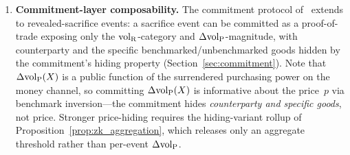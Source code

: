 \begin{theorem}
\begin{enumerate}
\item[\textbf{(P4)}] \textbf{Commitment-layer composability.}
  The commitment protocol
  of~\citep[Definition~6]{lasser2026exo} extends to
  revealed-sacrifice events: a sacrifice event can be committed as
  a proof-of-trade exposing only the ${\operatorname{vol}_{\mathrm{R}}}$-category and
  $\Delta{\operatorname{vol}_{\mathrm{P}}}$-magnitude, with counterparty and the specific
  benchmarked/unbenchmarked goods hidden by the commitment's
  hiding property (Section~\ref{sec:commitment}).  Note that
  $\Delta{\operatorname{vol}_{\mathrm{P}}}(X)$ is a public function of the surrendered
  purchasing power on the money channel, so committing
  $\Delta{\operatorname{vol}_{\mathrm{P}}}(X)$ is informative about the price~$p$ via
  benchmark inversion---the commitment hides
  \emph{counterparty and specific goods}, not price.
  Stronger price-hiding requires the hiding-variant rollup of
  Proposition~\ref{prop:zk_aggregation}, which releases only an
  aggregate threshold rather than per-event $\Delta{\operatorname{vol}_{\mathrm{P}}}$.
\end{enumerate}
\end{theorem}

